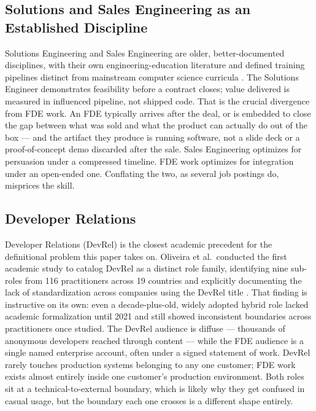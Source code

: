 \documentclass[journal]{IEEEtran}
\begin{document}
\subsection{Solutions and Sales Engineering as an Established Discipline}

Solutions Engineering and Sales Engineering are older, better-documented disciplines, with their own engineering-education literature and defined training pipelines distinct from mainstream computer science curricula \cite{bumblauskas2017sellingtechnicalsales,scottbeuk2020saleseducation}. The Solutions Engineer demonstrates feasibility before a contract closes; value delivered is measured in influenced pipeline, not shipped code. That is the crucial divergence from FDE work. An FDE typically arrives after the deal, or is embedded to close the gap between what was sold and what the product can actually do out of the box --- and the artifact they produce is running software, not a slide deck or a proof-of-concept demo discarded after the sale. Sales Engineering optimizes for persuasion under a compressed timeline. FDE work optimizes for integration under an open-ended one. Conflating the two, as several job postings do, misprices the skill.

\subsection{Developer Relations}

Developer Relations (DevRel) is the closest academic precedent for the definitional problem this paper takes on. Oliveira et al.\ conducted the first academic study to catalog DevRel as a distinct role family, identifying nine sub-roles from 116 practitioners across 19 countries and explicitly documenting the lack of standardization across companies using the DevRel title \cite{oliveira2021devrel}. That finding is instructive on its own: even a decade-plus-old, widely adopted hybrid role lacked academic formalization until 2021 and still showed inconsistent boundaries across practitioners once studied. The DevRel audience is diffuse --- thousands of anonymous developers reached through content --- while the FDE audience is a single named enterprise account, often under a signed statement of work. DevRel rarely touches production systems belonging to any one customer; FDE work exists almost entirely inside one customer's production environment. Both roles sit at a technical-to-external boundary, which is likely why they get confused in casual usage, but the boundary each one crosses is a different shape entirely.
\end{document}
